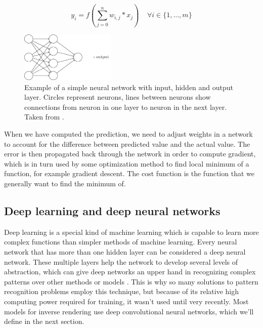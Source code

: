     \begin{equation} \label{eq:feed-forward}
        y_i = f(\sum_{j=0}^{n} w_{i, j} * x_j) \; \; \; \; \forall i \in \{1, \dots, m \}
    \end{equation}{}
    \begin{figure}
        \centerline{\includegraphics[width=0.4\textwidth]{praca/images/nn.png}}
        \caption[Example of a simple neural network]{Example of a simple neural network with input, hidden and output layer. Circles represent neurons, lines between neurons show connections from neuron in one layer to neuron in the next layer. Taken from \cite{nielsenneural}.}
        \label{img:simple_nn}
    \end{figure}
    When we have computed the prediction, we need to adjust weights in a network to account for the difference between predicted value and the actual value. The error is then propagated back through the network in order to compute gradient, which is in turn used by some optimization method to find local minimum of a function, for example gradient descent. The cost function is the function that we generally want to find the minimum of.
    \subsection{Deep learning and deep neural networks} \label{deep-learning}
    Deep learning is a special kind of machine learning which is capable to learn more complex functions than simpler methods of machine learning. Every neural network that has more than one hidden layer can be considered a deep neural network. These multiple layers help the network to develop several levels of abstraction, which can give deep networks an upper hand in recognizing complex patterns over other methods or models \cite{deep-learning}. This is why so many solutions to pattern recognition problems employ this technique, but because of its relative high computing power required for training, it wasn't used until very recently. Most models for inverse rendering use deep convolutional neural networks, which we'll define in the next section.

